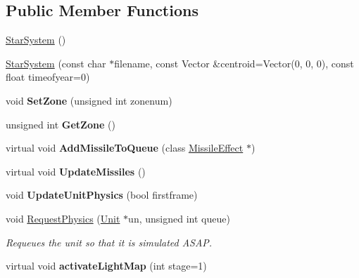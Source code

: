 \subsection*{Public Member Functions}
\begin{DoxyCompactItemize}
\item 
\hyperlink{classStarSystem_ac725dd1dfdb4474127ca1ae36885196b}{Star\+System} ()
\item 
\hyperlink{classStarSystem_a0bc8d41a7815ffaa5ba60fd70cfb9f71}{Star\+System} (const char $\ast$filename, const Vector \&centroid=Vector(0, 0, 0), const float timeofyear=0)
\item 
void {\bfseries Set\+Zone} (unsigned int zonenum)\hypertarget{classStarSystem_a572e0644de68b51621ee9e5a8145b903}{}\label{classStarSystem_a572e0644de68b51621ee9e5a8145b903}

\item 
unsigned int {\bfseries Get\+Zone} ()\hypertarget{classStarSystem_abcf075d8d8e22bc2a4520afc8bbb596b}{}\label{classStarSystem_abcf075d8d8e22bc2a4520afc8bbb596b}

\item 
virtual void {\bfseries Add\+Missile\+To\+Queue} (class \hyperlink{classMissileEffect}{Missile\+Effect} $\ast$)\hypertarget{classStarSystem_a2cb3b268b0e69eb42e9ee498394aca41}{}\label{classStarSystem_a2cb3b268b0e69eb42e9ee498394aca41}

\item 
virtual void {\bfseries Update\+Missiles} ()\hypertarget{classStarSystem_a991bcdedcfc709867ab3d1fbaebbc315}{}\label{classStarSystem_a991bcdedcfc709867ab3d1fbaebbc315}

\item 
void {\bfseries Update\+Unit\+Physics} (bool firstframe)\hypertarget{classStarSystem_aa1bc08840c7bf404827021869a1cbb39}{}\label{classStarSystem_aa1bc08840c7bf404827021869a1cbb39}

\item 
void \hyperlink{classStarSystem_a4c1430d5d251a5cd8d51e1818e819309}{Request\+Physics} (\hyperlink{classUnit}{Unit} $\ast$un, unsigned int queue)\hypertarget{classStarSystem_a4c1430d5d251a5cd8d51e1818e819309}{}\label{classStarSystem_a4c1430d5d251a5cd8d51e1818e819309}

\begin{DoxyCompactList}\small\item\em Requeues the unit so that it is simulated A\+S\+AP. \end{DoxyCompactList}\item 
virtual void {\bfseries activate\+Light\+Map} (int stage=1)\hypertarget{classStarSystem_a4fd53b29bcad5b6369218eee1e26fb12}{}\label{classStarSystem_a4fd53b29bcad5b6369218eee1e26fb12}


\end{DoxyCompactItemize}
